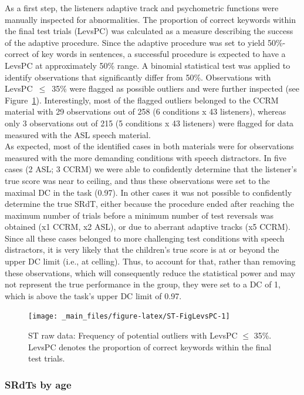 \documentclass[a4paper, twoside]{templates/ociamthesis}
\begin{document}
As a first step, the listeners adaptive track and psychometric functions were manually inspected for abnormalities. The proportion of correct keywords within the final test trials (LevsPC) was calculated as a measure describing the success of the adaptive procedure. Since the adaptive procedure was set to yield 50\%-correct of key words in sentences, a successful procedure is expected to have a LevsPC at approximately 50\% range. A binomial statistical test was applied to identify observations that significantly differ from 50\%. Observations with LevsPC~\(\leq\)~35\% were flagged as possible outliers and were further inspected (see Figure~\ref{fig:ST-FigLevsPC}). Interestingly, most of the flagged outliers belonged to the CCRM material with 29 observations out of 258 (6 conditions x 43 listeners), whereas only 3 observations out of 215 (5 conditions x 43 listeners) were flagged for data measured with the ASL speech material.\\

As expected, most of the identified cases in both materials were for observations measured with the more demanding conditions with speech distractors. In five cases (2 ASL; 3 CCRM) we were able to confidently determine that the listener's true score was near to ceiling, and thus these observations were set to the maximal DC in the task (0.97). In other cases it was not possible to confidently determine the true SRdT, either because the procedure ended after reaching the maximum number of trials before a minimum number of test reversals was obtained (x1 CCRM, x2 ASL), or due to aberrant adaptive tracks (x5 CCRM). Since all these cases belonged to more challenging test conditions with speech distractors, it is very likely that the children's true score is at or beyond the upper DC limit (i.e., at celling). Thus, to account for that, rather than removing these observations, which will consequently reduce the statistical power and may not represent the true performance in the group, they were set to a DC of 1, which is above the task's upper DC limit of 0.97.\\

\begin{figure}
\texttt{[image: \_main\_files/figure-latex/ST-FigLevsPC-1]} \caption{ST raw data: Frequency of potential outliers with LevsPC $\leq$ 35\%. LevsPC denotes the proportion of correct keywords within the final test trials.}\label{fig:ST-FigLevsPC}
\end{figure}

\hypertarget{srdts-by-age}{%
\subsubsection*{SRdTs by age}\label{srdts-by-age}}
\end{document}
